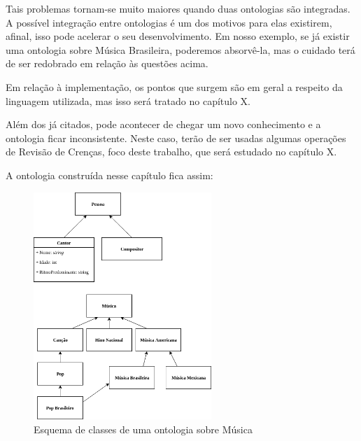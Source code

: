 Tais problemas tornam-se muito maiores quando duas ontologias são integradas. A possível integração entre ontologias é um dos motivos para elas existirem, afinal, isso pode acelerar o seu desenvolvimento. Em nosso exemplo, se já existir uma ontologia sobre Música Brasileira, poderemos absorvê-la, mas o cuidado terá de ser redobrado em relação às questões acima. 

Em relação à implementação, os pontos que surgem são em geral a respeito da linguagem utilizada, mas isso será tratado no capítulo {\color{red} X}.

Além dos já citados, pode acontecer de chegar um novo conhecimento e a ontologia ficar inconsistente. Neste caso, terão de ser usadas algumas operações de Revisão de Crenças, foco deste trabalho, que será estudado no capítulo {\color{red} X}.

A ontologia construída nesse capítulo fica assim: 

\begin{figure}[H]
	\centering
	\includegraphics[width=0.6\textwidth]{Capitulos/Ontologias/OntologiaMusica}
	\caption{Esquema de classes de uma ontologia sobre Música}
\end{figure}